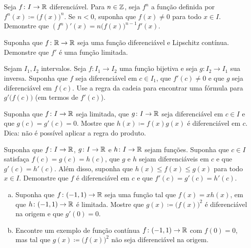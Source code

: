 \begin{exercise}
Seja $f \colon I \to {\mathbb{R}}$ diferenciável. Para $n \in {\mathbb{Z}}$, seja $f^n$
a função definida por $f^n(x) \coloneqq {\bigl( f(x) \bigr)}^n$. Se
$n < 0$, suponha que $f(x) \neq 0$ para todo $x \in I$. Demonstre que
$(f^n)'(x) = n {\bigl(f(x) \bigr)}^{n-1} f'(x)$.
\end{exercise}

\begin{exercise}
Suponha que $f \colon {\mathbb{R}} \to {\mathbb{R}}$ seja uma função diferenciável
e Lipschitz contínua.
Demonstre que $f'$ é uma função limitada.
\end{exercise}

\begin{exercise} \label{exercise:inversederformula}
Sejam $I_1, I_2$ intervalos.
Seja $f \colon I_1 \to I_2$ uma função bijetiva e seja $g \colon I_2 \to I_1$
sua inversa. Suponha que $f$ seja diferenciável em $c \in I_1$,
que $f'(c) \neq 0$ e que $g$ seja diferenciável em $f(c)$. Use a regra da cadeia
para encontrar uma fórmula para $g'\bigl(f(c)\bigr)$ (em termos de $f'(c)$).
\end{exercise}

\begin{exercise} \label{exercise:bndmuldiff}
Suponha que $f \colon I \to {\mathbb{R}}$ seja limitada, que $g \colon I \to
{\mathbb{R}}$ seja diferenciável em $c \in I$ e que $g(c) = g'(c) = 0$. Mostre
que $h(x) \coloneqq f(x) g(x)$ é diferenciável em $c$. Dica: não é possível
aplicar a regra do produto.
\end{exercise}

\begin{exercise} \label{exercise:diffsqueeze}
Suponha que $f \colon I \to {\mathbb{R}}$,
$g \colon I \to {\mathbb{R}}$ e $h \colon I \to {\mathbb{R}}$ sejam funções. Suponha que
$c \in I$ satisfaça $f(c) = g(c) = h(c)$, que $g$ e $h$ sejam diferenciáveis
em $c$ e que $g'(c) = h'(c)$. Além disso, suponha que $h(x) \leq f(x) \leq g(x)$
para todo $x \in I$. Demonstre que $f$ é diferenciável em $c$ e que
$f'(c) = g'(c) = h'(c)$.
\end{exercise}

\begin{exercise}
\leavevmode
\begin{enumerate}[a)]
\item
Suponha que $f \colon (-1,1) \to {\mathbb{R}}$ seja uma função tal que $f(x) = x h(x)$,
em que $h \colon (-1,1) \to {\mathbb{R}}$ é limitada.
Mostre que $g(x) \coloneqq {\bigl( f(x) \bigr)}^2$ é diferenciável na origem
e que $g'(0) = 0$.
\item
Encontre um exemplo de função contínua $f \colon (-1,1) \to {\mathbb{R}}$ com $f(0) = 0$,
mas tal que $g(x) \coloneqq {\bigl( f(x) \bigr)}^2$ não seja diferenciável na origem.
\end{enumerate}
\end{exercise}

